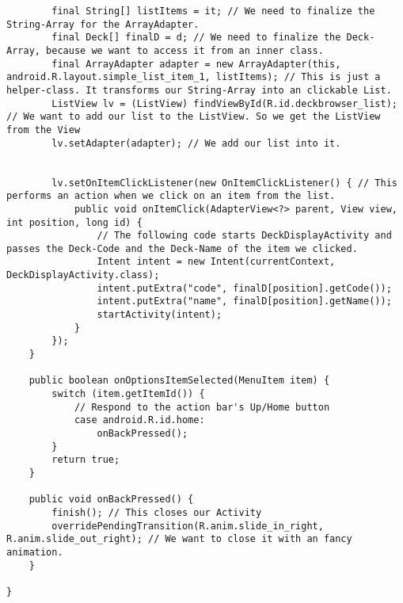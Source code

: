 \begin{lstlisting}
        final String[] listItems = it; // We need to finalize the String-Array for the ArrayAdapter.
        final Deck[] finalD = d; // We need to finalize the Deck-Array, because we want to access it from an inner class.
        final ArrayAdapter adapter = new ArrayAdapter(this, android.R.layout.simple_list_item_1, listItems); // This is just a helper-class. It transforms our String-Array into an clickable List.
        ListView lv = (ListView) findViewById(R.id.deckbrowser_list); // We want to add our list to the ListView. So we get the ListView from the View
        lv.setAdapter(adapter); // We add our list into it.


        lv.setOnItemClickListener(new OnItemClickListener() { // This performs an action when we click on an item from the list.
            public void onItemClick(AdapterView<?> parent, View view, int position, long id) {
                // The following code starts DeckDisplayActivity and passes the Deck-Code and the Deck-Name of the item we clicked.
                Intent intent = new Intent(currentContext, DeckDisplayActivity.class);
                intent.putExtra("code", finalD[position].getCode());
                intent.putExtra("name", finalD[position].getName());
                startActivity(intent);
            }
        });
    }

    public boolean onOptionsItemSelected(MenuItem item) {
        switch (item.getItemId()) {
            // Respond to the action bar's Up/Home button
            case android.R.id.home:
                onBackPressed();
        }
        return true;
    }

    public void onBackPressed() {
        finish(); // This closes our Activity
        overridePendingTransition(R.anim.slide_in_right, R.anim.slide_out_right); // We want to close it with an fancy animation.
    }

}
\end{lstlisting}
\newpage
